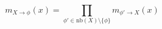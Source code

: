 $$
m_{X \rightarrow \phi}(x)
=
\prod_{\phi' \in \mathrm{nb}(X) \setminus \{\phi\}}
m_{\phi' \rightarrow X}(x)
$$
